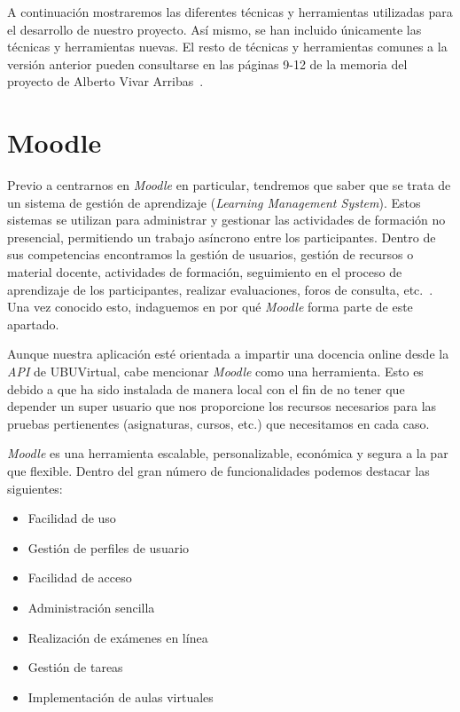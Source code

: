 A continuación mostraremos las diferentes técnicas y herramientas utilizadas para el desarrollo de nuestro proyecto. Así mismo, se han incluido únicamente las técnicas y herramientas nuevas. El resto de técnicas y herramientas comunes a la versión anterior pueden consultarse en las páginas 9-12 de la memoria del proyecto de Alberto Vivar Arribas~\cite{github:alberto-viewer}.

\section{Moodle}\label{sec:moodle-local}
Previo a centrarnos en \textit{Moodle} en particular, tendremos que saber que se trata de un sistema de gestión de aprendizaje (\textit{Learning Management System}). Estos sistemas se utilizan para administrar y gestionar las actividades de formación no presencial, permitiendo un trabajo asíncrono entre los participantes. Dentro de sus competencias encontramos la gestión de usuarios, gestión de recursos o material docente, actividades de formación, seguimiento en el proceso de aprendizaje de los participantes, realizar evaluaciones, foros de consulta, etc.~\cite{wiki:sistemaGestionAprendizaje}. Una vez conocido esto, indaguemos en por qué \textit{Moodle} forma parte de este apartado.

Aunque nuestra aplicación esté orientada a impartir una docencia online desde la \textit{API} de UBUVirtual, cabe mencionar \textit{Moodle} como una herramienta. Esto es debido a que ha sido instalada de manera local con el fin de no tener que depender un super usuario que nos proporcione los recursos necesarios para las pruebas pertienentes (asignaturas, cursos, etc.) que necesitamos en cada caso.

\textit{Moodle} es una herramienta escalable, personalizable, económica y segura a la par que flexible. Dentro del gran número de funcionalidades podemos destacar las siguientes:

\begin{itemize}
	\item Facilidad de uso
	\item Gestión de perfiles de usuario
	\item Facilidad de acceso
	\item Administración sencilla
	\item Realización de exámenes en línea
	\item Gestión de tareas
	\item Implementación de aulas virtuales
\end{itemize}

